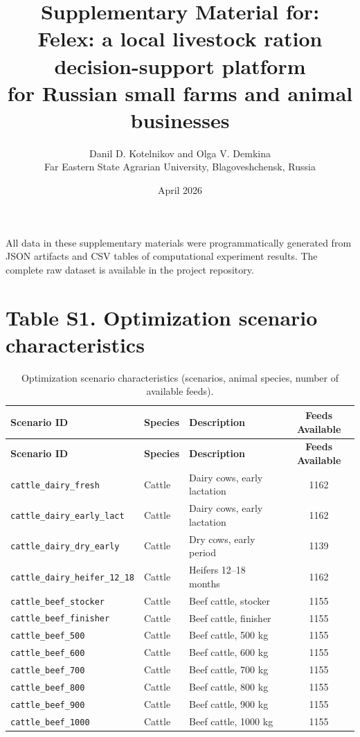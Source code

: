 \documentclass[11pt]{article}
\title{Supplementary Material for:\\[0.5em]
\large Felex: a local livestock ration decision-support platform\\
for Russian small farms and animal businesses}
\author{Danil D. Kotelnikov and Olga V. Demkina\\[0.3em]
\small Far Eastern State Agrarian University, Blagoveshchensk, Russia}
\date{April 2026}
\begin{document}
\maketitle

All data in these supplementary materials were programmatically generated from JSON artifacts and CSV tables of computational experiment results. The complete raw dataset is available in the project repository.

\section*{Table S1. Optimization scenario characteristics}
\begin{longtable}{lllc}
\caption{Optimization scenario characteristics (scenarios, animal species, number of available feeds).}\label{tab:s1_scenarios} \\
\toprule
\textbf{Scenario ID} & \textbf{Species} & \textbf{Description} & \textbf{Feeds Available} \\
\midrule
\endfirsthead
\toprule
\textbf{Scenario ID} & \textbf{Species} & \textbf{Description} & \textbf{Feeds Available} \\
\midrule
\endhead
\bottomrule
\endfoot
\bottomrule
\endlastfoot
\texttt{cattle\_dairy\_fresh} & Cattle & Dairy cows, early lactation & 1162 \\
\texttt{cattle\_dairy\_early\_lact} & Cattle & Dairy cows, early lactation & 1162 \\
\texttt{cattle\_dairy\_dry\_early} & Cattle & Dry cows, early period & 1139 \\
\texttt{cattle\_dairy\_heifer\_12\_18} & Cattle & Heifers 12--18 months & 1162 \\
\texttt{cattle\_beef\_stocker} & Cattle & Beef cattle, stocker & 1155 \\
\texttt{cattle\_beef\_finisher} & Cattle & Beef cattle, finisher & 1155 \\
\texttt{cattle\_beef\_500} & Cattle & Beef cattle, 500 kg & 1155 \\
\texttt{cattle\_beef\_600} & Cattle & Beef cattle, 600 kg & 1155 \\
\texttt{cattle\_beef\_700} & Cattle & Beef cattle, 700 kg & 1155 \\
\texttt{cattle\_beef\_800} & Cattle & Beef cattle, 800 kg & 1155 \\
\texttt{cattle\_beef\_900} & Cattle & Beef cattle, 900 kg & 1155 \\
\texttt{cattle\_beef\_1000} & Cattle & Beef cattle, 1000 kg & 1155 \\

\end{longtable}
\end{document}

